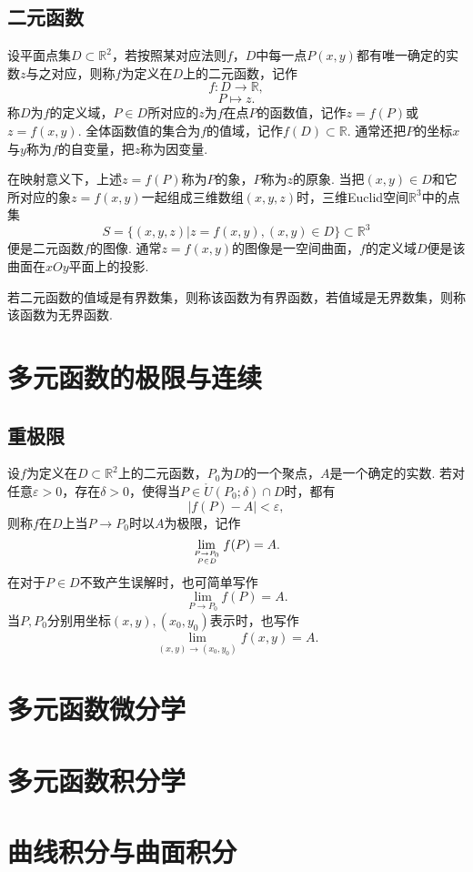 \documentclass[lang=cn,10pt]{elegantbook}
\begin{document}
\section{二元函数}
\begin{definition}[二元函数]
	设平面点集$D\subset\mathbb{R}^2$，若按照某对应法则$f$，$D$中每一点$P(x,y)$都有唯一确定的实数$z$与之对应，则称$f$为定义在$D$上的{\heiti 二元函数}，记作
	$$f:D\to\mathbb{R},$$
	$$P\mapsto z.$$
	称$D$为$f$的定义域，$P\in D$所对应的$z$为$f$在点$P$的函数值，记作$z=f(P)$或$z=f(x,y)$. 全体函数值的集合为$f$的值域，记作$f(D)\subset\mathbb{R}$. 通常还把$P$的坐标$x$与$y$称为$f$的{\heiti 自变量}，把$z$称为{\heiti 因变量}.
\end{definition}
在映射意义下，上述$z=f(P)$称为$P$的{\heiti 象}，$P$称为$z$的{\heiti 原象}. 当把$(x,y)\in D$和它所对应的象$z=f(x,y)$一起组成三维数组$(x,y,z)$时，三维Euclid空间$\mathbb{R}^3$中的点集
$$S=\{(x,y,z)|z=f(x,y),(x,y)\in D\}\subset\mathbb{R}^3$$
便是二元函数$f$的{\heiti 图像}. 通常$z=f(x,y)$的图像是一空间曲面，$f$的定义域$D$便是该曲面在$xOy$平面上的投影.

若二元函数的值域是有界数集，则称该函数为{\heiti 有界函数}，若值域是无界数集，则称该函数为{\heiti 无界函数}.

\chapter{多元函数的极限与连续}
\section{重极限}
\begin{definition}[重极限]
	设$f$为定义在$D\subset\mathbb{R}^2$上的二元函数，$P_0$为$D$的一个聚点，$A$是一个确定的实数. 若对任意$\varepsilon>0$，存在$\delta>0$，使得当$P\in\mathring{U}(P_0;\delta)\cap D$时，都有
	$$|f(P)-A|<\varepsilon,$$
	则称$f$在$D$上当$P\to P_0$时以$A$为极限，记作
	$$\lim\limits_{P\to P_0\atop P\in D}f(P)=A.$$
	在对于$P\in D$不致产生误解时，也可简单写作
	$$\lim\limits_{P\to P_0}f(P)=A.$$
	当$P,P_0$分别用坐标$(x,y),(x_0,y_0)$表示时，也写作
	$$\lim\limits_{(x,y)\to(x_0,y_0)}f(x,y)=A.$$
\end{definition}
\chapter{多元函数微分学}
\chapter{多元函数积分学}
\chapter{曲线积分与曲面积分}
\end{document}
